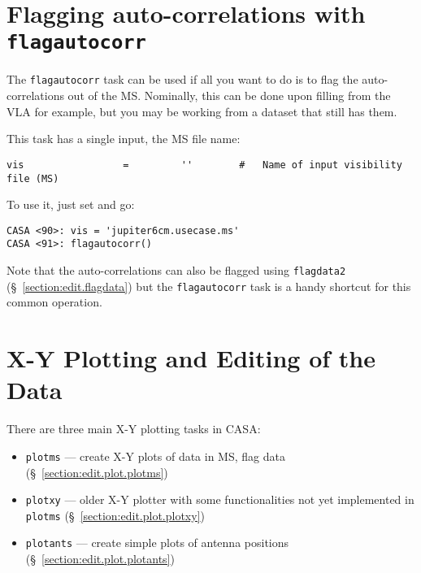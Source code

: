  
\section{Flagging auto-correlations with {\tt flagautocorr}}
\label{section:edit.flagautocorr}

The {\tt flagautocorr} task can be used if all you want to do
is to flag the auto-correlations out of the MS.  Nominally,
this can be done upon filling from the VLA for example, but
you may be working from a dataset that still has them.

This task has a single input, the MS file name:
\small
\begin{verbatim}
vis                 =         ''        #   Name of input visibility file (MS)
\end{verbatim}
\normalsize
To use it, just set and go:
\small
\begin{verbatim}
CASA <90>: vis = 'jupiter6cm.usecase.ms'                                         
CASA <91>: flagautocorr()
\end{verbatim}
\normalsize

Note that the auto-correlations can also be flagged using 
{\tt flagdata2} (\S~\ref{section:edit.flagdata}) but the 
{\tt flagautocorr} task is a handy shortcut for this common
operation.

\section{X-Y Plotting and Editing of the Data}
\label{section:edit.plot}

There are three main X-Y plotting tasks in CASA:
\begin{itemize}
   \item {\tt plotms} --- create X-Y plots of data in MS, flag data
      (\S~\ref{section:edit.plot.plotms})
   \item {\tt plotxy} --- older X-Y plotter with some functionalities not yet implemented in {\tt plotms}
      (\S~\ref{section:edit.plot.plotxy})
   \item {\tt plotants} --- create simple plots of antenna positions
      (\S~\ref{section:edit.plot.plotants})
\end{itemize}

